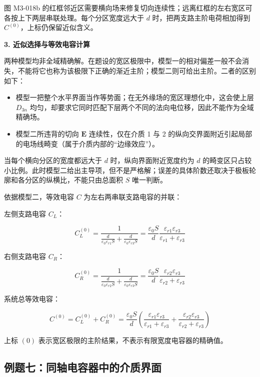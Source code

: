 图 M3-018b
的红框邻近区需要横向场来修复切向连续性；远离红框的左右宽区可各按上下两层串联处理。每个分区宽度远大于
\(d\) 时，把两支路主阶电荷相加得到 \(C^{(0)}\)，上标仍保留近似含义。

\textbf{3. 近似选择与等效电容计算}

两种模型均非全域精确解。在题设的宽区极限中，模型一的相对偏差一般不会消失，不能将它也称为该极限下正确的渐近主阶；模型二则可给出主阶。二者的区别如下：

\begin{itemize}
\tightlist
\item
  模型一把整个水平界面当作等势面；在无外缘场的宽区理想化中，这会使上层
  \(D_{3n}\)
  均匀，却要求它同时匹配下层两个不同的法向电位移，因此不能作为全域精确场。
\item
  模型二所违背的切向 \(\mathbf{E}\) 连续性，仅在介质 1 与 2
  的纵向交界面附近引起局部的电场线畸变（属于介质内部的``边缘效应''）。
\end{itemize}

当每个横向分区的宽度都远大于 \(d\) 时，纵向界面附近宽度约为 \(d\)
的畸变区只占较小比例。此时模型二给出主导项，但不是严格解；误差的具体阶数还取决于极板轮廓和各分区的纵横比，不能只由总面积
\(S\) 唯一判断。

依据模型二，等效电容 \(C\) 为左右两串联支路电容的并联：

左侧支路电容 \(C_L\)：

\[
C_L^{(0)} = \frac{1}{\frac{d}{\varepsilon_0 \varepsilon_{r1} S} + \frac{d}{\varepsilon_0 \varepsilon_{r3} S}} = \frac{\varepsilon_0 S}{d} \frac{\varepsilon_{r1} \varepsilon_{r3}}{\varepsilon_{r1} + \varepsilon_{r3}}
\]

右侧支路电容 \(C_R\)：

\[
C_R^{(0)} = \frac{1}{\frac{d}{\varepsilon_0 \varepsilon_{r2} S} + \frac{d}{\varepsilon_0 \varepsilon_{r3} S}} = \frac{\varepsilon_0 S}{d} \frac{\varepsilon_{r2} \varepsilon_{r3}}{\varepsilon_{r2} + \varepsilon_{r3}}
\]

系统总等效电容：

\[
C^{(0)} = C_L^{(0)} + C_R^{(0)} = \frac{\varepsilon_0 S}{d} \left( \frac{\varepsilon_{r1} \varepsilon_{r3}}{\varepsilon_{r1} + \varepsilon_{r3}} + \frac{\varepsilon_{r2} \varepsilon_{r3}}{\varepsilon_{r2} + \varepsilon_{r3}} \right)
\]

上标 \((0)\) 表示宽区极限的主阶结果，不表示有限宽度电容器的精确值。

\subsection{例题七：同轴电容器中的介质界面}\label{m3:ux4f8bux9898ux4e03ux540cux8f74ux7535ux5bb9ux5668ux4e2dux7684ux4ecbux8d28ux754cux9762}

